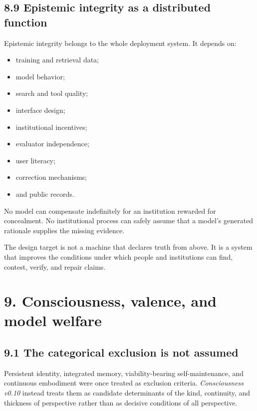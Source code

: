 \documentclass[
  11pt,
]{article}
\providecommand{\tightlist}{%
  \setlength{\itemsep}{0pt}\setlength{\parskip}{0pt}}
\begin{document}
\subsection{8.9 Epistemic integrity as a distributed
function}\label{epistemic-integrity-as-a-distributed-function}

Epistemic integrity belongs to the whole deployment system. It depends
on:

\begin{itemize}
\tightlist
\item
  training and retrieval data;
\item
  model behavior;
\item
  search and tool quality;
\item
  interface design;
\item
  institutional incentives;
\item
  evaluator independence;
\item
  user literacy;
\item
  correction mechanisms;
\item
  and public records.
\end{itemize}

No model can compensate indefinitely for an institution rewarded for
concealment. No institutional process can safely assume that a model's
generated rationale supplies the missing evidence.

The design target is not a machine that declares truth from above. It is
a system that improves the conditions under which people and
institutions can find, contest, verify, and repair claims.

\section{9. Consciousness, valence, and model
welfare}\label{consciousness-valence-and-model-welfare}

\subsection{9.1 The categorical exclusion is not
assumed}\label{the-categorical-exclusion-is-not-assumed}

Persistent identity, integrated memory, viability-bearing
self-maintenance, and continuous embodiment were once treated as
exclusion criteria. \emph{Consciousness v0.10} instead treats them as
candidate determinants of the kind, continuity, and thickness of
perspective rather than as decisive conditions of all perspective.
\end{document}
